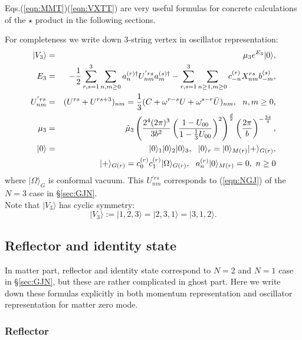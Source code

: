 \documentclass[12pt,a4paper]{article}
\begin{document}
Eqs.(\ref{eqn:MMT})(\ref{eqn:VXTT}) are very useful formulas for concrete calculations of the $\star$ product in the following sections.


For completeness we write down 3-string vertex in oscillator representation:
\begin{eqnarray}
|V_3\rangle&=& \mu_3 e^{E_3}|0\rangle,\nonumber \\
E_3 &=& -{1\over2}\sum_{r,s=1}^3\sum_{n,m\geq0}a_n^{(r)\dagger}U_{nm}^{'rs}a_m^{(s)\dagger}-\sum_{r,s=1}^3 \sum_{n\geq1,m\geq0}c_{-n}^{(r)}X^{rs}_{nm}b_{-m}^{(s)}, \nonumber \\
U^{'rs}_{nm}&=&(U^{rs}+U^{rs+3})_{nm}={1\over3}(C+\omega^{r-s}U+\omega^{s-r}{\bar U})_{nm},\ \ n,m\geq0, \nonumber \\
\mu_3&=&{\tilde \mu}_3\left({2^4(2\pi)^3\over3b^2} \left({1-U_{00}\over1-{1\over3}U_{00}}\right)^2\right)^{d\over2}\left({2\pi\over b}\right)^{-{3d\over4}},\nonumber \\
|0\rangle&=&|0\rangle_1|0\rangle_2|0\rangle_3,\ \ |0\rangle_r=|0\rangle_{M(r)} |+\rangle_{G(r)}, \nonumber \\
&&|+\rangle_{G(r)}=c_0^{(r)}c_1^{(r)}|\Omega\rangle_{G(r)},\ \ 
a^{(r)}_n|0\rangle_{M(r)}=0,\ n\geq0
\end{eqnarray}
where $|\Omega\rangle_G$ is conformal vacuum. This $U^{'rs}_{nm}$ corresponds to (\ref{eqn:NGJ}) of the $N=3$ case in \S \ref{sec:GJN}.\\

Note that $|V_3\rangle$ has cyclic symmetry:
\begin{equation}
|V_3\rangle:=|1,2,3\rangle=|2,3,1\rangle=|3,1,2\rangle.
\end{equation}

\subsection{Reflector and identity state}

In matter part, reflector and identity state correspond to $N=2$ and $N=1$ case in \S \ref{sec:GJN}, but these are rather complicated in ghost part. Here we write down these formulas explicitly in both momentum representation and oscillator representation for matter zero mode.

\subsubsection{Reflector}
\end{document}
